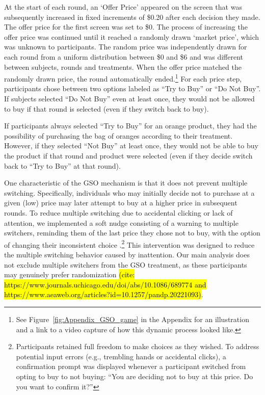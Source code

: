 \documentclass[12pt]{article}
\begin{document}
At the start of each round, an `Offer Price' appeared on the screen that was subsequently increased in fixed increments of \$0.20 after each decision they made. The offer price for the first screen was set to \$0. The process of increasing the offer price was continued until it reached a randomly drawn `market price', which was unknown to participants. The random price was independently drawn for each round from a uniform distribution between \$0 and \$6 and was different between subjects, rounds and treatments. When the offer price matched the randomly drawn price, the round automatically ended.\footnote{See Figure~\ref{fig:Appendix_GSO_game} in the Appendix for an illustration and a link to a video capture of how this dynamic process looked like.} For each price step, participants chose between two options labeled as ``Try to Buy'' or ``Do Not Buy''. If subjects selected ``Do Not Buy'' even at least once, they would not be allowed to buy if that round is selected (even if they switch back to buy). 

If participants always selected ``Try to Buy'' for an orange product, they had the possibility of purchasing the bag of oranges according to their treatment. However, if they selected ``Not Buy'' at least once, they would not be able to buy the product if that round and product were selected (even if they decide switch back to ``Try to Buy'' at that round). 

One characteristic of the GSO mechanism is that it does not prevent multiple switching. Specifically, individuals who may initially decide not to purchase at a given (low) price may later attempt to buy at a higher price in subsequent rounds. To reduce multiple switching due to accidental clicking or lack of attention, we implemented a soft nudge consisting of a warning to multiple switchers, reminding them of the last price they chose not to buy, with the option of changing their inconsistent choice \citep{yu2021multiple}.\footnote{Participants retained full freedom to make choices as they wished. To address potential input errors (e.g., trembling hands or accidental clicks), a confirmation prompt was displayed whenever a participant switched from opting to buy to not buying: ``You are deciding not to buy at this price. Do you want to confirm it?''} %
This intervention was designed to reduce the multiple switching behavior caused by inattention. Our main analysis does not exclude multiple switchers from the GSO treatment, as these participants may genuinely prefer randomization \hl{(cite: https://www.journals.uchicago.edu/doi/abs/10.1086/689774 and https://www.aeaweb.org/articles?id=10.1257/pandp.20221093)}. %
    
\end{document}
